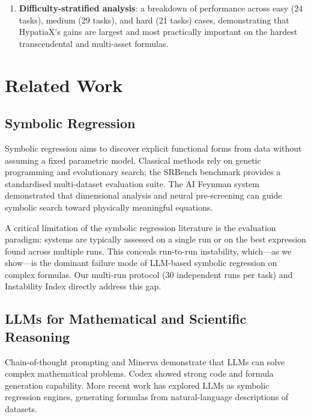 \documentclass[twoside,11pt]{article}
\begin{document}
\begin{enumerate}[leftmargin=2em,label=(\roman*)]
  \item \textbf{Difficulty-stratified analysis}: a breakdown of performance across
    easy (24 tasks), medium (29 tasks), and hard (21 tasks) cases, demonstrating
    that HypatiaX's gains are largest and most practically important on the hardest
    transcendental and multi-asset formulas.
\end{enumerate}

\section{Related Work}
\label{sec:related}

\subsection{Symbolic Regression}\label{subsec:symbolic-regression}
\label{sec:related_sr}

Symbolic regression aims to discover explicit functional forms from data without
assuming a fixed parametric model.  Classical methods rely on genetic programming
\citep{koza1992genetic} and evolutionary search; the SRBench benchmark \citep{lacava2021contemporary}
provides a standardised multi-dataset evaluation suite.  The AI Feynman
system \citep{udrescu2020ai} demonstrated that dimensional analysis and neural
pre-screening can guide symbolic search toward physically meaningful equations.

A critical limitation of the symbolic regression literature is the evaluation
paradigm: systems are typically assessed on a single run or on the best expression
found across multiple runs.  This conceals run-to-run instability, which---as we
show---is the dominant failure mode of LLM-based symbolic regression on complex
formulas.  Our multi-run protocol (30 independent runs per task) and Instability
Index directly address this gap.

\subsection{LLMs for Mathematical and Scientific Reasoning}\label{subsec:llms-for-mathematical-and-scientific-rea}
\label{sec:related_llm}

Chain-of-thought prompting \citep{wei2022chain} and Minerva \citep{lewkowycz2022minerva}
demonstrate that LLMs can solve complex mathematical problems.  Codex \citep{chen2021evaluating}
showed strong code and formula generation capability.  More recent work has explored
LLMs as symbolic regression engines, generating formulas from natural-language
descriptions of datasets.
\end{document}
